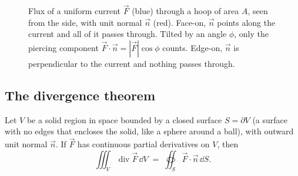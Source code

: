 \begin{figure}[htbp]
\centering
{}
\caption{Flux of a uniform current $\vec F$ (blue) through a hoop of area $A$, seen
from the side, with unit normal $\vec n$ (red). Face-on, $\vec n$ points along the
current and all of it passes through. Tilted by an angle $\phi$, only the piercing
component $\vec F\cdot\vec n = |\vec F|\cos\phi$ counts. Edge-on, $\vec n$ is
perpendicular to the current and nothing passes through.}
\label{ch35:fig-flux-hoop}
\end{figure}

\subsection{The divergence theorem}

\begin{theorem}
\label{ch35:thm-div}
Let $V$ be a solid region in space bounded by a closed surface $S=\partial V$ (a
surface with no edges that encloses the solid, like a sphere around a ball), with
outward unit normal $\vec n$. If $\vec F$ has continuous partial derivatives on $V$, then
\[
  \iiint_V \operatorname{div}\vec F\,\dd V \;=\; \oiint_{S}\vec F\cdot\vec n\,\dd S.
\]
\end{theorem}

